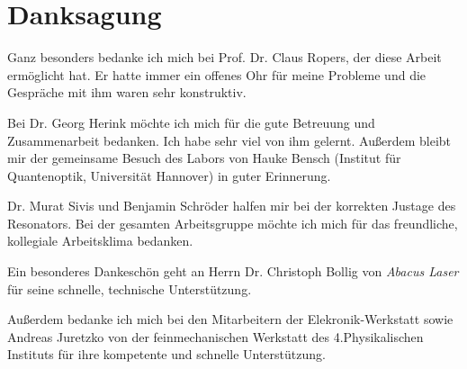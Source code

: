\documentclass[bachelor,       %
               twoside,        %
               BCOR10mm,       %
               liststotoc,nomtotoc,bibtotoc, %
               english,ngerman, %
               final,          %
               ]{GAUBM}
\begin{document}
\chapter*{Danksagung}
\parindent0mm
\parskip2mm
Ganz besonders bedanke ich mich bei Prof. Dr. Claus Ropers, der diese Arbeit ermöglicht hat.
Er hatte immer ein offenes Ohr für meine Probleme und die Gespräche mit ihm waren sehr konstruktiv.

Bei Dr. Georg Herink möchte ich mich für die gute Betreuung und Zusammenarbeit bedanken.
Ich habe sehr viel von ihm gelernt.
Außerdem bleibt mir der gemeinsame Besuch des Labors von Hauke Bensch (Institut für Quantenoptik, Universität Hannover) in guter Erinnerung.

Dr. Murat Sivis und Benjamin Schröder halfen mir bei der korrekten Justage des Resonators.
Bei der gesamten Arbeitsgruppe möchte ich mich für das freundliche, kollegiale Arbeitsklima bedanken.

Ein besonderes Dankeschön geht an Herrn Dr. Christoph Bollig von \textit{Abacus Laser} für seine schnelle, technische Unterstützung.

Außerdem bedanke ich mich bei den Mitarbeitern der Elekronik-Werkstatt sowie Andreas Juretzko von der feinmechanischen Werkstatt des 4.Physikalischen Instituts für ihre kompetente und schnelle Unterstützung.

\cleardoublepage
\Declaration
\end{document}
